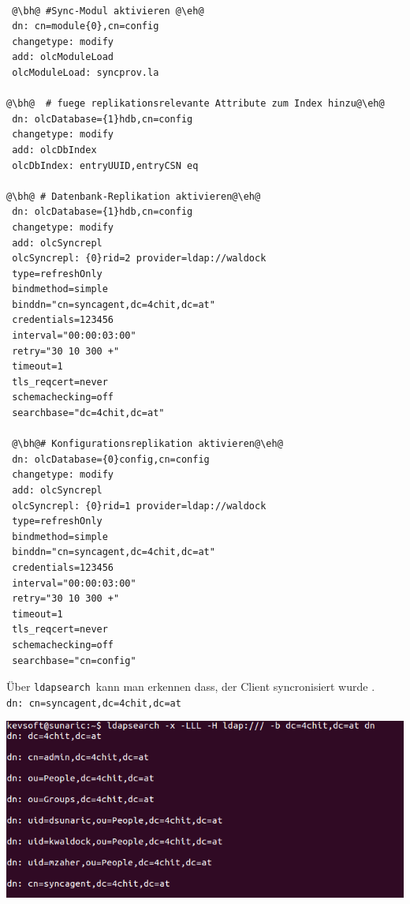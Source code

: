 \begin{lstlisting}[escapechar=@]

 @\bh@ #Sync-Modul aktivieren @\eh@
 dn: cn=module{0},cn=config
 changetype: modify
 add: olcModuleLoad
 olcModuleLoad: syncprov.la
 
@\bh@  # fuege replikationsrelevante Attribute zum Index hinzu@\eh@
 dn: olcDatabase={1}hdb,cn=config
 changetype: modify
 add: olcDbIndex
 olcDbIndex: entryUUID,entryCSN eq
 
@\bh@ # Datenbank-Replikation aktivieren@\eh@
 dn: olcDatabase={1}hdb,cn=config
 changetype: modify
 add: olcSyncrepl
 olcSyncrepl: {0}rid=2 provider=ldap://waldock
 type=refreshOnly
 bindmethod=simple
 binddn="cn=syncagent,dc=4chit,dc=at"
 credentials=123456
 interval="00:00:03:00"
 retry="30 10 300 +"
 timeout=1
 tls_reqcert=never
 schemachecking=off
 searchbase="dc=4chit,dc=at"
 
 @\bh@# Konfigurationsreplikation aktivieren@\eh@
 dn: olcDatabase={0}config,cn=config
 changetype: modify
 add: olcSyncrepl
 olcSyncrepl: {0}rid=1 provider=ldap://waldock
 type=refreshOnly
 bindmethod=simple
 binddn="cn=syncagent,dc=4chit,dc=at"
 credentials=123456
 interval="00:00:03:00"
 retry="30 10 300 +"
 timeout=1
 tls_reqcert=never
 schemachecking=off
 searchbase="cn=config"
\end{lstlisting}
 Über \verb|ldapsearch |kann man erkennen dass, der Client syncronisiert wurde .\\ \verb|dn: cn=syncagent,dc=4chit,dc=at|
\begin{center}
	\includegraphics[width=1.0\linewidth]{images/a10_show_slave_sync_result_after_time.PNG}
\end{center}
